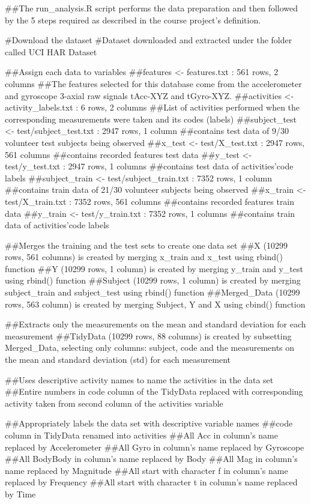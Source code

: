 \documentclass[
]{article}
\author{}
\date{\vspace{-2.5em}}
\begin{document}
\#\#The run\_analysis.R script performs the data preparation and then
followed by the 5 steps required as described in the course project's
definition.

\#Download the dataset \#Dataset downloaded and extracted under the
folder called UCI HAR Dataset

\#\#Assign each data to variables \#\#features \textless- features.txt :
561 rows, 2 columns \#\#The features selected for this database come
from the accelerometer and gyroscope 3-axial raw signals tAcc-XYZ and
tGyro-XYZ. \#\#activities \textless- activity\_labels.txt : 6 rows, 2
columns \#\#List of activities performed when the corresponding
measurements were taken and its codes (labels) \#\#subject\_test
\textless- test/subject\_test.txt : 2947 rows, 1 column \#\#contains
test data of 9/30 volunteer test subjects being observed \#\#x\_test
\textless- test/X\_test.txt : 2947 rows, 561 columns \#\#contains
recorded features test data \#\#y\_test \textless- test/y\_test.txt :
2947 rows, 1 columns \#\#contains test data of activities'code labels
\#\#subject\_train \textless- test/subject\_train.txt : 7352 rows, 1
column \#\#contains train data of 21/30 volunteer subjects being
observed \#\#x\_train \textless- test/X\_train.txt : 7352 rows, 561
columns \#\#contains recorded features train data \#\#y\_train
\textless- test/y\_train.txt : 7352 rows, 1 columns \#\#contains train
data of activities'code labels

\#\#Merges the training and the test sets to create one data set \#\#X
(10299 rows, 561 columns) is created by merging x\_train and x\_test
using rbind() function \#\#Y (10299 rows, 1 column) is created by
merging y\_train and y\_test using rbind() function \#\#Subject (10299
rows, 1 column) is created by merging subject\_train and subject\_test
using rbind() function \#\#Merged\_Data (10299 rows, 563 column) is
created by merging Subject, Y and X using cbind() function

\#\#Extracts only the measurements on the mean and standard deviation
for each measurement \#\#TidyData (10299 rows, 88 columns) is created by
subsetting Merged\_Data, selecting only columns: subject, code and the
measurements on the mean and standard deviation (std) for each
measurement

\#\#Uses descriptive activity names to name the activities in the data
set \#\#Entire numbers in code column of the TidyData replaced with
corresponding activity taken from second column of the activities
variable

\#\#Appropriately labels the data set with descriptive variable names
\#\#code column in TidyData renamed into activities \#\#All Acc in
column's name replaced by Accelerometer \#\#All Gyro in column's name
replaced by Gyroscope \#\#All BodyBody in column's name replaced by Body
\#\#All Mag in column's name replaced by Magnitude \#\#All start with
character f in column's name replaced by Frequency \#\#All start with
character t in column's name replaced by Time
\end{document}
